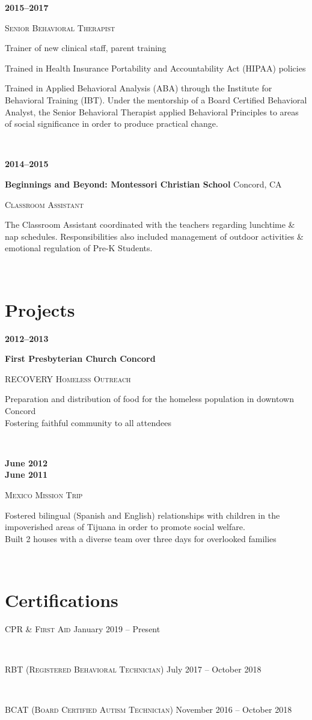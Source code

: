 \documentclass[letterpaper,11pt]{article}
\newcommand{\datestyle}{\hfill \textbf}
\newcommand{\flstyle}{\textbf}
\newcommand{\slstyle}{\normalsize\textsc}
\newcommand{\sumstyle}{\footnotesize}
\newcommand{\locstyle}{\textnormal}
\newcommand{\work}[5]{

\begin{minipage}[t]{.15\textwidth}
\datestyle{#1}

\end{minipage}
\hfill\vline\hfill
\begin{minipage}[t]{.80\textwidth}
\flstyle{#2}
\hfill\locstyle{#4}

\vspace{.2cm}
\slstyle{#3}

\vspace{.1cm}
\sumstyle{#5}
\end{minipage}\\
\vspace{.2cm}
\normalfont
}
\newcommand{\cert}[2]{
\begin{minipage}[t]{1\textwidth}
	\textsc{#1} \hfill \locstyle{#2}
\end{minipage}
}
\newcommand{\workext}[3]{

\begin{minipage}[t]{.15\textwidth}
\raggedleft\datestyle{#1}
\end{minipage}
\hfill\vline\hfill
\begin{minipage}[t]{.80\textwidth}

\slstyle{#2}

\vspace{.1cm}

\sumstyle{#3}
\end{minipage}\\
\vspace{.2cm}
\normalfont
}
\begin{document}
\workext
{2015--2017}
{Senior Behavioral Therapist}
{Trainer of new clinical staff, parent training

Trained in Health Insurance Portability and Accountability Act (HIPAA) policies

Trained in Applied Behavioral Analysis (ABA) through the Institute for Behavioral Training (IBT).
Under the mentorship of a Board Certified Behavioral Analyst, the Senior Behavioral Therapist applied Behavioral Principles to areas of social significance in order to produce practical change.
}
\vspace{1em}
\work
{2014--2015}
{Beginnings and Beyond: Montessori Christian School}
{Classroom Assistant}
{Concord, CA}
{The Classroom Assistant coordinated with the teachers regarding lunchtime \& nap schedules. Responsibilities also included management of outdoor activities \& emotional regulation of Pre-K Students.}
\clearpage
\section{Projects}%
\vspace{1em}
\work{2012--2013}
 {First Presbyterian Church Concord}
{RECOVERY Homeless Outreach}
{ }
{Preparation and distribution of food for the homeless population in downtown Concord\\
Fostering faithful community to all attendees}
\vspace{1em}
\workext{June 2012\\  June 2011}
{Mexico Mission Trip}
{Fostered bilingual (Spanish and English) relationships with children in the impoverished areas of Tijuana in order to promote social welfare.\\
Built 2 houses with a diverse team over three days for overlooked families}
\vspace{1em}
\section{Certifications}%
\vspace{1em}
\cert{CPR \& First Aid}{January 2019 -- Present}\\
\vspace{1em}
\cert{RBT (Registered Behavioral Technician)}{July 2017 -- October 2018}\\
\vspace{1em}
\cert{BCAT (Board Certified Autism Technician)}{November 2016 -- October 2018}
\end{document}
